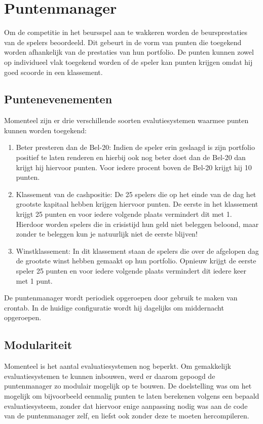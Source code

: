 %
%

\chapter{Puntenmanager}

Om de competitie in het beursspel aan te wakkeren worden de beursprestaties van de spelers beoordeeld. Dit gebeurt in de vorm van punten die toegekend worden afhankelijk van de prestaties van hun portfolio. De punten kunnen zowel op individueel vlak toegekend worden of de speler kan punten krijgen omdat hij goed scoorde in een klassement.

\section{Puntenevenementen}

Momenteel zijn er drie verschillende soorten evalutiesystemen waarmee punten kunnen worden toegekend:

\begin{enumerate}
\item Beter presteren dan de Bel-20: Indien de speler erin geslaagd is zijn portfolio positief te laten renderen en hierbij ook nog beter doet dan de Bel-20 dan krijgt hij hiervoor punten. Voor iedere procent boven de Bel-20 krijgt hij 10 punten.
\item Klassement van de cashpositie: De 25 spelers die op het einde van de dag het grootste kapitaal hebben krijgen hiervoor punten. De eerste in het klassement krijgt 25 punten en voor iedere volgende plaats vermindert dit met 1. Hierdoor worden spelers die in crisistijd hun geld niet beleggen beloond, maar zonder te beleggen kun je natuurlijk niet de eerste blijven!
\item Winstklassement: In dit klassement staan de spelers die over de afgelopen dag de grootste winst hebben gemaakt op hun portfolio. Opnieuw krijgt de eerste speler 25 punten en voor iedere volgende plaats vermindert dit iedere keer met 1 punt.
\end{enumerate}

De puntenmanager wordt periodiek opgeroepen door gebruik te maken van crontab. In de huidige configuratie wordt hij dagelijks om middernacht opgeroepen.

\section{Modulariteit}

Momenteel is het aantal evaluatiesystemen nog beperkt. Om gemakkelijk evaluatiesystemen te kunnen inbouwen, werd er daarom gepoogd de puntenmanager zo modulair mogelijk op te bouwen. De doelstelling was om het mogelijk om bijvoorbeeld eenmalig punten te laten berekenen volgens een bepaald evaluatiesysteem, zonder dat hiervoor enige aanpassing nodig was aan de code van de puntenmanager zelf, en liefst ook zonder deze te moeten hercompileren.

